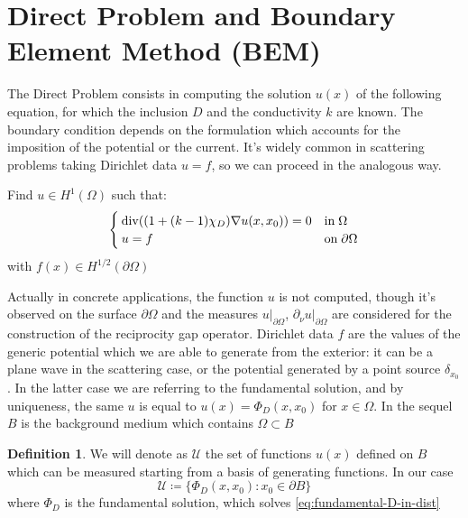 \documentclass[10pt, a4paper, twoside, openright]{book}
\theoremstyle{definition}
\newtheorem{definition}[subsection]{Definition}
\theoremstyle{plain}
\theoremstyle{plain}
\theoremstyle{plain}
\theoremstyle{plain}
\theoremstyle{plain}
\theoremstyle{plain}
\theoremstyle{plain}
\theoremstyle{plain}
\DeclareMathOperator{\divergence}{div}
\begin{document}
\section{Direct Problem and Boundary Element Method (BEM)}
The Direct Problem consists in computing the solution $u(x)$ of the following equation, for which the inclusion $D$ and the conductivity $k$ are known. The boundary condition depends on the formulation which accounts for the imposition of the potential or the current. It's widely common in scattering problems taking Dirichlet data $u=f$, so we can proceed in the analogous way.
\begin{center}
\colorbox{light-gray}{\color{black}\parbox{\textwidth}{
Find $u \in H^1(\Omega)$ such that:
\begin{equation}
  \begin{cases}
  \divergence((1+(k-1)\chi_D)\nabla u(x,x_0)) = 0 & \textup{in}\;\Omega\\
  u = f & \textup{on}\;\partial\Omega
 \end{cases}
\end{equation}
with $f(x) \in H^{1/2}(\partial\Omega)$
}}
\end{center}
Actually in concrete applications, the function $u$ is not computed, though it's observed on the surface $\partial\Omega$ and the measures $u|_{\partial \Omega}$, $\partial_\nu u|_{\partial \Omega}$ are considered for the construction of the reciprocity gap operator. Dirichlet data $f$ are the values of the generic potential which we are able to generate from the exterior: it can be a plane wave in the scattering case, or the potential generated by a point source $\delta_{x_0}$. In the latter case we are referring to the fundamental solution, and by uniqueness, the same $u$ is equal to $u(x)=\Phi_D(x,x_0)$ for $x\in \Omega$.
In the sequel $B$ is the background medium which contains $\Omega\subset B$
\begin{definition}
\label{def:setU}
We will denote as $\mathcal{U}$ the set of functions $u(x)$ defined on $B$ which can be measured starting from a basis of generating functions.
In our case
\begin{equation}
 \mathcal{U}\coloneqq\bigl\{\Phi_D(x, x_0): x_0\in \partial B\bigr\}
\end{equation}
where $\Phi_D$ is the fundamental solution, which solves \ref{eq:fundamental-D-in-dist}
\end{definition}
\begin{center}
\end{center}
\end{document}
